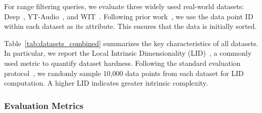 \documentclass[sigconf, nonacm]{acmart}
\begin{document}
\begin{sloppypar}
For range filtering queries, we evaluate three widely used real-world datasets: Deep~\cite{yandex_deep_dataset}, YT-Audio~\cite{youtube8m_dataset}, and WIT~\cite{wit_dataset}. Following prior work~\cite{DSG}, we use the data point ID within each dataset as its attribute. This ensures that the data is initially sorted.

Table~\ref{tab:datasets_combined} summarizes the key characteristics of all datasets. In particular, we report the Local Intrinsic Dimensionality (LID)~\cite{Lid}, a commonly used metric to quantify dataset hardness. Following the standard evaluation protocol~\cite{LID2}, we randomly sample 10,000 data points from each dataset for LID computation. A higher LID indicates greater intrinsic complexity.

\setlength{\textfloatsep}{0.1cm}
\setlength{\floatsep}{0cm}
\begin{table}[t]
\centering
\setlength{\abovecaptionskip}{0.05cm}
\setlength{\textfloatsep}{0.cm}
\caption{Datassets}

\label{tab:datasets_combined}
\end{table}



\subsubsection{Evaluation Metrics}


\end{sloppypar}
\end{document}
